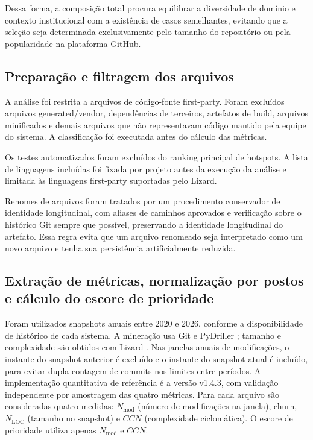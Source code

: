 \documentclass[12pt]{article}
\newcommand{\Nmod}{\ensuremath{N_{\mathrm{mod}}}}
\newcommand{\NLOC}{\ensuremath{N_{\mathrm{LOC}}}}
\newcommand{\CCN}{\ensuremath{CCN}}
\begin{document}
Dessa forma, a composição total procura equilibrar a diversidade de domínio e contexto institucional com a existência de casos semelhantes, evitando que a seleção seja determinada exclusivamente pelo tamanho do repositório ou pela popularidade na plataforma GitHub.

\subsection{Preparação e filtragem dos arquivos}

A análise foi restrita a arquivos de código-fonte first-party. Foram excluídos arquivos generated/vendor, dependências de terceiros, artefatos de build, arquivos minificados e demais arquivos que não representavam código mantido pela equipe do sistema. A classificação foi executada antes do cálculo das métricas.

Os testes automatizados foram excluídos do ranking principal de hotspots. A lista de linguagens incluídas foi fixada por projeto antes da execução da análise e limitada às linguagens first-party suportadas pelo Lizard.

Renomes de arquivos foram tratados por um procedimento conservador de identidade longitudinal, com aliases de caminhos aprovados e verificação sobre o histórico Git sempre que possível, preservando a identidade longitudinal do artefato. Essa regra evita que um arquivo renomeado seja interpretado como um novo arquivo e tenha sua persistência artificialmente reduzida.

\subsection{Extração de métricas, normalização por postos e cálculo do escore de prioridade}

Foram utilizados snapshots anuais entre 2020 e 2026, conforme a disponibilidade de histórico de cada sistema. A mineração usa Git e PyDriller \cite{pydriller}; tamanho e complexidade são obtidos com Lizard \cite{lizard}. Nas janelas anuais de modificações, o instante do snapshot anterior é excluído e o instante do snapshot atual é incluído, para evitar dupla contagem de commits nos limites entre períodos. A implementação quantitativa de referência é a versão v1.4.3, com validação independente por amostragem das quatro métricas. Para cada arquivo são consideradas quatro medidas: \Nmod{} (número de modificações na janela), churn, \NLOC{} (tamanho no snapshot) e \CCN{} (complexidade ciclomática). O escore de prioridade utiliza apenas \Nmod{} e \CCN{}.
\end{document}
